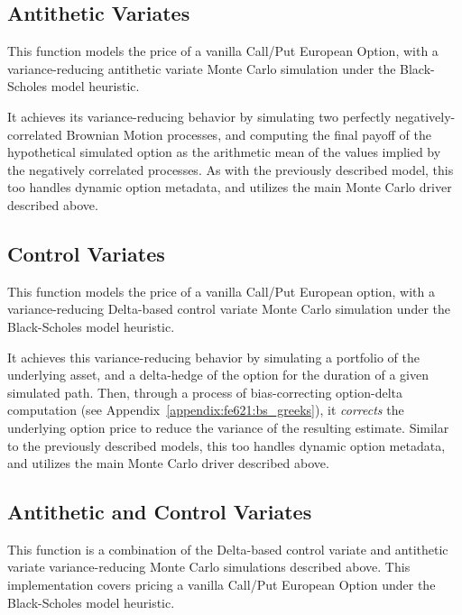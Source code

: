 \documentclass[10pt]{article}
\begin{document}
\newpage
\subsection{Antithetic Variates}

This function models the price of a vanilla Call/Put European Option, with a variance-reducing antithetic variate Monte Carlo simulation under the Black-Scholes model heuristic.

It achieves its variance-reducing behavior by simulating two perfectly negatively-correlated Brownian Motion processes, and computing the final payoff of the hypothetical simulated option as the arithmetic mean of the values implied by the negatively correlated processes. As with the previously described model, this too handles dynamic option metadata, and utilizes the main Monte Carlo driver described above.

    

\subsection{Control Variates}

This function models the price of a vanilla Call/Put European option, with a variance-reducing Delta-based control variate Monte Carlo simulation under the Black-Scholes model heuristic.

It achieves this variance-reducing behavior by simulating a portfolio of the underlying asset, and a delta-hedge of the option for the duration of a given simulated path. Then, through a process of bias-correcting option-delta computation (see Appendix~\ref{appendix:fe621:bs_greeks}), it \textit{corrects} the underlying option price to reduce the variance of the resulting estimate. Similar to the previously described models, this too handles dynamic option metadata, and utilizes the main Monte Carlo driver described above.

    

\subsection{Antithetic and Control Variates}

This function is a combination of the Delta-based control variate and antithetic variate variance-reducing Monte Carlo simulations described above. This implementation covers pricing a vanilla Call/Put European Option under the Black-Scholes model heuristic.
\end{document}
